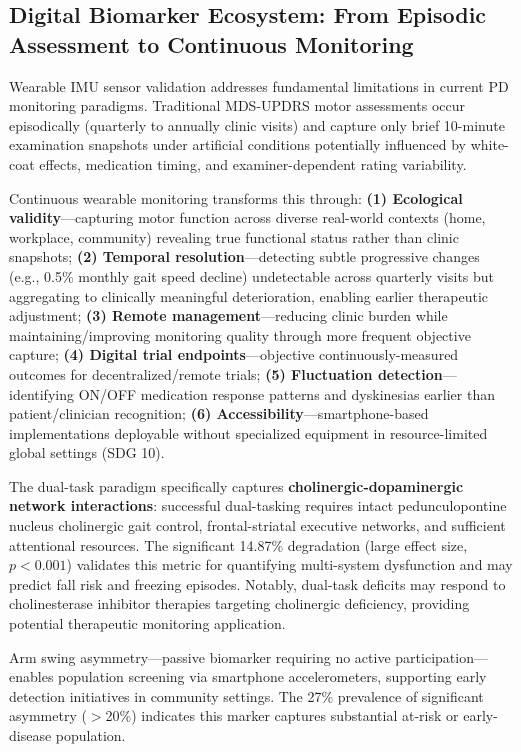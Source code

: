 \documentclass[11pt]{article}
\begin{document}
\subsection*{Digital Biomarker Ecosystem: From Episodic Assessment to Continuous Monitoring}

Wearable IMU sensor validation addresses fundamental limitations in current PD monitoring paradigms. Traditional MDS-UPDRS motor assessments occur episodically (quarterly to annually clinic visits) and capture only brief 10-minute examination snapshots under artificial conditions potentially influenced by white-coat effects, medication timing, and examiner-dependent rating variability\cite{goetz2008movement,espay2024disease}.

Continuous wearable monitoring transforms this through: \textbf{(1) Ecological validity}—capturing motor function across diverse real-world contexts (home, workplace, community) revealing true functional status rather than clinic snapshots; \textbf{(2) Temporal resolution}—detecting subtle progressive changes (e.g., 0.5\% monthly gait speed decline) undetectable across quarterly visits but aggregating to clinically meaningful deterioration, enabling earlier therapeutic adjustment; \textbf{(3) Remote management}—reducing clinic burden while maintaining/improving monitoring quality through more frequent objective capture; \textbf{(4) Digital trial endpoints}—objective continuously-measured outcomes for decentralized/remote trials; \textbf{(5) Fluctuation detection}—identifying ON/OFF medication response patterns and dyskinesias earlier than patient/clinician recognition; \textbf{(6) Accessibility}—smartphone-based implementations deployable without specialized equipment in resource-limited global settings (SDG 10)\cite{adams2024using,mirelman2024wearable}.

The dual-task paradigm specifically captures \textbf{cholinergic-dopaminergic network interactions}\cite{bohnen2013cholinergic,raffegeau2019meta}: successful dual-tasking requires intact pedunculopontine nucleus cholinergic gait control, frontal-striatal executive networks, and sufficient attentional resources. The significant 14.87\% degradation (large effect size, $p<0.001$) validates this metric for quantifying multi-system dysfunction and may predict fall risk and freezing episodes. Notably, dual-task deficits may respond to cholinesterase inhibitor therapies targeting cholinergic deficiency, providing potential therapeutic monitoring application.

Arm swing asymmetry—passive biomarker requiring no active participation—enables population screening via smartphone accelerometers\cite{adams2024using}, supporting early detection initiatives in community settings. The 27\% prevalence of significant asymmetry ($>$20\%) indicates this marker captures substantial at-risk or early-disease population.
\end{document}
